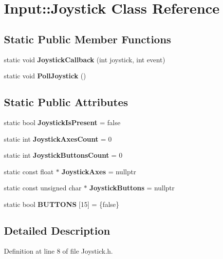 \hypertarget{class_input_1_1_joystick}{}\section{Input\+:\+:Joystick Class Reference}
\label{class_input_1_1_joystick}
\subsection*{Static Public Member Functions}
\begin{DoxyCompactItemize}
\item 
static void {\bfseries Joystick\+Callback} (int joystick, int event)\hypertarget{class_input_1_1_joystick_ae0b085eeeef63d61a8bed3b8b904be88}{}\label{class_input_1_1_joystick_ae0b085eeeef63d61a8bed3b8b904be88}

\item 
static void {\bfseries Poll\+Joystick} ()\hypertarget{class_input_1_1_joystick_a16c96624e81c0c1999b1e250c4724582}{}\label{class_input_1_1_joystick_a16c96624e81c0c1999b1e250c4724582}

\end{DoxyCompactItemize}
\subsection*{Static Public Attributes}
\begin{DoxyCompactItemize}
\item 
static bool {\bfseries Joystick\+Is\+Present} = false\hypertarget{class_input_1_1_joystick_a396b09c69a2285330828f532d507b076}{}\label{class_input_1_1_joystick_a396b09c69a2285330828f532d507b076}

\item 
static int {\bfseries Joystick\+Axes\+Count} = 0\hypertarget{class_input_1_1_joystick_a5d55d48ef69cdc4d8eb411e48a27f730}{}\label{class_input_1_1_joystick_a5d55d48ef69cdc4d8eb411e48a27f730}

\item 
static int {\bfseries Joystick\+Buttons\+Count} = 0\hypertarget{class_input_1_1_joystick_a393af49faede7855ee04e56400d1f9c3}{}\label{class_input_1_1_joystick_a393af49faede7855ee04e56400d1f9c3}

\item 
static const float $\ast$ {\bfseries Joystick\+Axes} = nullptr\hypertarget{class_input_1_1_joystick_ae4893eb5418ddcc68f7e8c33a2d2758c}{}\label{class_input_1_1_joystick_ae4893eb5418ddcc68f7e8c33a2d2758c}

\item 
static const unsigned char $\ast$ {\bfseries Joystick\+Buttons} = nullptr\hypertarget{class_input_1_1_joystick_add8b4ecf1b2d2b320cf4192f5b5af234}{}\label{class_input_1_1_joystick_add8b4ecf1b2d2b320cf4192f5b5af234}

\item 
static bool {\bfseries B\+U\+T\+T\+O\+NS} \mbox{[}15\mbox{]} = \{false\}\hypertarget{class_input_1_1_joystick_a622aac22546454bc35233c64041582e2}{}\label{class_input_1_1_joystick_a622aac22546454bc35233c64041582e2}

\end{DoxyCompactItemize}


\subsection{Detailed Description}


Definition at line 8 of file Joystick.\+h.

